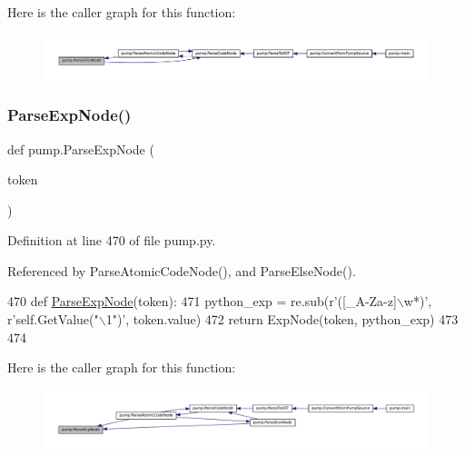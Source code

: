 Here is the caller graph for this function\+:
\nopagebreak
\begin{figure}[H]
\begin{center}
\leavevmode
\includegraphics[width=350pt]{namespacepump_ae40493525a993e81929c6905e329a406_icgraph}
\end{center}
\end{figure}
\mbox{\label{namespacepump_af62b08489d90e69d0577e82c98383ba7}} 
\subsubsection{\texorpdfstring{Parse\+Exp\+Node()}{ParseExpNode()}}
{\footnotesize\ttfamily def pump.\+Parse\+Exp\+Node (\begin{DoxyParamCaption}\item[{}]{token }\end{DoxyParamCaption})}



Definition at line 470 of file pump.\+py.



Referenced by Parse\+Atomic\+Code\+Node(), and Parse\+Else\+Node().


\begin{DoxyCode}
470 \textcolor{keyword}{def }\hyperlink{namespacepump_af62b08489d90e69d0577e82c98383ba7}{ParseExpNode}(token):
471   python\_exp = re.sub(\textcolor{stringliteral}{r'([\_A-Za-z]\(\backslash\)w*)'}, \textcolor{stringliteral}{r'self.GetValue("\(\backslash\)1")'}, token.value)
472   \textcolor{keywordflow}{return} ExpNode(token, python\_exp)
473 
474 
\end{DoxyCode}
Here is the caller graph for this function\+:
\nopagebreak
\begin{figure}[H]
\begin{center}
\leavevmode
\includegraphics[width=350pt]{namespacepump_af62b08489d90e69d0577e82c98383ba7_icgraph}
\end{center}
\end{figure}
\mbox{\label{namespacepump_ae094486db14ecec9347129c5f230042d}} 
